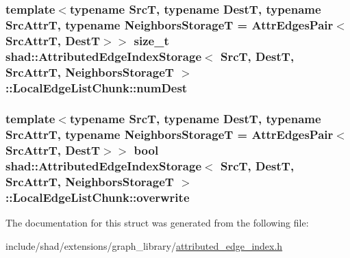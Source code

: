 \hypertarget{structshad_1_1AttributedEdgeIndexStorage_1_1LocalEdgeListChunk_a61208febc1046cfbc776d4ba5373049b}{
\subsubsection[{num\-Dest}]{\setlength{\rightskip}{0pt plus 5cm}template$<$typename Src\-T, typename Dest\-T, typename Src\-Attr\-T, typename Neighbors\-Storage\-T = Attr\-Edges\-Pair$<$\-Src\-Attr\-T, Dest\-T$>$$>$ size\-\_\-t {\bf shad\-::\-Attributed\-Edge\-Index\-Storage}$<$ Src\-T, Dest\-T, Src\-Attr\-T, Neighbors\-Storage\-T $>$\-::Local\-Edge\-List\-Chunk\-::num\-Dest}}\label{structshad_1_1AttributedEdgeIndexStorage_1_1LocalEdgeListChunk_a61208febc1046cfbc776d4ba5373049b}
\hypertarget{structshad_1_1AttributedEdgeIndexStorage_1_1LocalEdgeListChunk_af1893ff0035d04d432ff091b6c3758c0}{
\subsubsection[{overwrite}]{\setlength{\rightskip}{0pt plus 5cm}template$<$typename Src\-T, typename Dest\-T, typename Src\-Attr\-T, typename Neighbors\-Storage\-T = Attr\-Edges\-Pair$<$\-Src\-Attr\-T, Dest\-T$>$$>$ bool {\bf shad\-::\-Attributed\-Edge\-Index\-Storage}$<$ Src\-T, Dest\-T, Src\-Attr\-T, Neighbors\-Storage\-T $>$\-::Local\-Edge\-List\-Chunk\-::overwrite}}\label{structshad_1_1AttributedEdgeIndexStorage_1_1LocalEdgeListChunk_af1893ff0035d04d432ff091b6c3758c0}


The documentation for this struct was generated from the following file\-:\begin{DoxyCompactItemize}
\item 
include/shad/extensions/graph\-\_\-library/\hyperlink{attributed__edge__index_8h}{attributed\-\_\-edge\-\_\-index.\-h}\end{DoxyCompactItemize}
